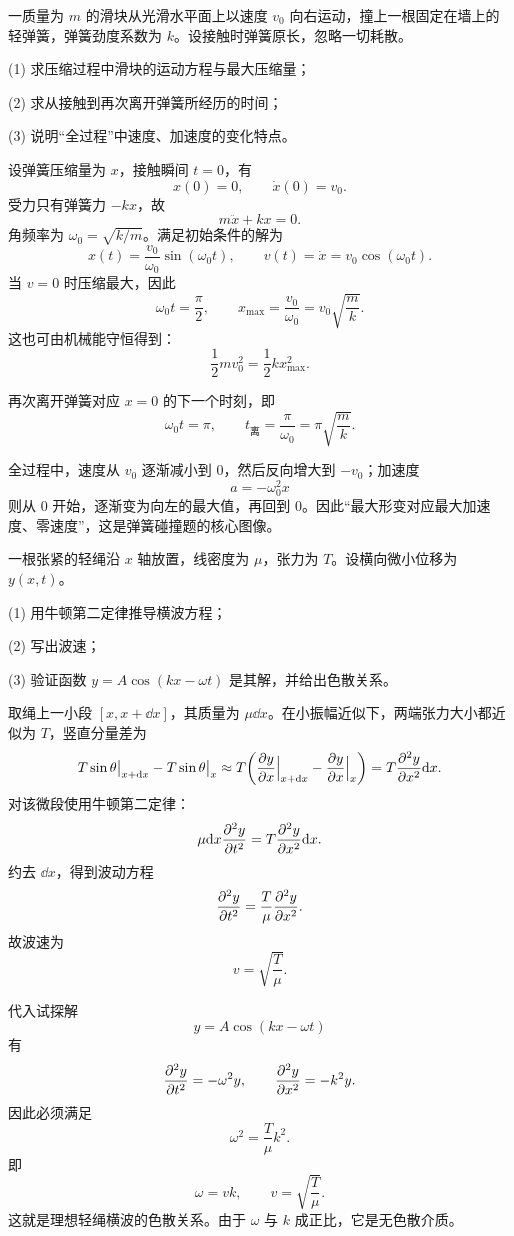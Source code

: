 \begin{competition}
一质量为 $m$ 的滑块从光滑水平面上以速度 $v_0$ 向右运动，撞上一根固定在墙上的轻弹簧，弹簧劲度系数为 $k$。设接触时弹簧原长，忽略一切耗散。

(1) 求压缩过程中滑块的运动方程与最大压缩量；

(2) 求从接触到再次离开弹簧所经历的时间；

(3) 说明“全过程”中速度、加速度的变化特点。

\begin{solution}
设弹簧压缩量为 $x$，接触瞬间 $t=0$，有
\[
x(0)=0,
\qquad
\dot x(0)=v_0.
\]
受力只有弹簧力 $-kx$，故
\[
m\ddot x+kx=0.
\]
角频率为 $\omega_0=\sqrt{k/m}$。满足初始条件的解为
\[
x(t)=\frac{v_0}{\omega_0}\sin(\omega_0 t),
\qquad
v(t)=\dot x=v_0\cos(\omega_0 t).
\]
当 $v=0$ 时压缩最大，因此
\[
\omega_0 t=\frac{\pi}{2},
\qquad
x_{\max}=\frac{v_0}{\omega_0}=v_0\sqrt{\frac{m}{k}}.
\]
这也可由机械能守恒得到：
\[
\frac12 mv_0^2=\frac12 kx_{\max}^2.
\]

再次离开弹簧对应 $x=0$ 的下一个时刻，即
\[
\omega_0 t=\pi,
\qquad
t_\text{离}=\frac{\pi}{\omega_0}=\pi\sqrt{\frac{m}{k}}.
\]

全过程中，速度从 $v_0$ 逐渐减小到 $0$，然后反向增大到 $-v_0$；加速度
\[
a=-\omega_0^2 x
\]
则从 $0$ 开始，逐渐变为向左的最大值，再回到 $0$。因此“最大形变对应最大加速度、零速度”，这是弹簧碰撞题的核心图像。
\end{solution}
\end{competition}

\begin{competition}
一根张紧的轻绳沿 $x$ 轴放置，线密度为 $\mu$，张力为 $T$。设横向微小位移为 $y(x,t)$。

(1) 用牛顿第二定律推导横波方程；

(2) 写出波速；

(3) 验证函数 $y=A\cos(kx-\omega t)$ 是其解，并给出色散关系。

\begin{solution}
取绳上一小段 $[x,x+\dd x]$，其质量为 $\mu\dd x$。在小振幅近似下，两端张力大小都近似为 $T$，竖直分量差为
\[
T\sin\theta\big|_{x+\dd x}-T\sin\theta\big|_x
\approx T\qty(\pdv{y}{x}\Big|_{x+\dd x}-\pdv{y}{x}\Big|_x)
= T\pdv[2]{y}{x}\dd x.
\]
对该微段使用牛顿第二定律：
\[
\mu\dd x\pdv[2]{y}{t}=T\pdv[2]{y}{x}\dd x.
\]
约去 $\dd x$，得到波动方程
\[
\pdv[2]{y}{t}=\frac{T}{\mu}\pdv[2]{y}{x}.
\]
故波速为
\[
v=\sqrt{\frac{T}{\mu}}.
\]

代入试探解
\[
y=A\cos(kx-\omega t)
\]
有
\[
\pdv[2]{y}{t}=-\omega^2 y,
\qquad
\pdv[2]{y}{x}=-k^2 y.
\]
因此必须满足
\[
\omega^2=\frac{T}{\mu}k^2.
\]
即
\[
\omega=vk,
\qquad
v=\sqrt{\frac{T}{\mu}}.
\]
这就是理想轻绳横波的色散关系。由于 $\omega$ 与 $k$ 成正比，它是无色散介质。
\end{solution}
\end{competition}

